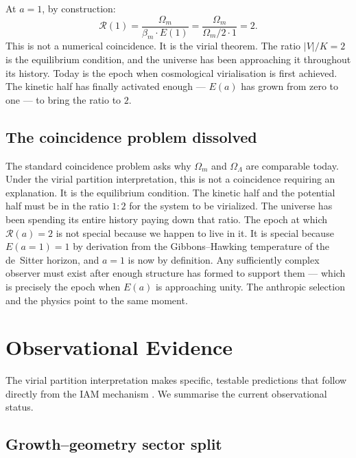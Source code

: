 \documentclass[12pt,a4paper]{article}
\begin{document}
At $a = 1$, by construction:
\begin{equation}
  \mathcal{R}(1) = \frac{\Omega_m}{\beta_m \cdot E(1)} = 
  \frac{\Omega_m}{\Omega_m/2 \cdot 1} = 2.
  \label{eq:virial_today}
\end{equation}
This is not a numerical coincidence. It is the virial theorem. The ratio $|V|/K = 2$
is the equilibrium condition, and the universe has been approaching it
throughout its history. Today is the epoch when cosmological virialisation is
first achieved. The kinetic half has finally activated enough --- $E(a)$ has
grown from zero to one --- to bring the ratio to $2$.

\subsection{The coincidence problem dissolved}

The standard coincidence problem asks why $\Omega_m$ and $\Omega_\Lambda$ are
comparable today. Under the virial partition interpretation, this is not a
coincidence requiring an explanation. It is the equilibrium condition. The
kinetic half and the potential half must be in the ratio $1:2$ for the
system to be virialized. The universe has been spending its entire history
paying down that ratio. The epoch at which $\mathcal{R}(a) = 2$ is not
special because we happen to live in it. It is special because $E(a = 1) = 1$
by derivation from the Gibbons--Hawking temperature of the de~Sitter horizon,
and $a = 1$ is now by definition. Any sufficiently complex observer must exist
after enough structure has formed to support them --- which is precisely the
epoch when $E(a)$ is approaching unity. The anthropic selection and the
physics point to the same moment.

\section{Observational Evidence}
\label{sec:evidence}

The virial partition interpretation makes specific, testable predictions that
follow directly from the IAM mechanism \citep{mahaffey2026,mahaffey2026_desi}.
We summarise the current observational status.

\subsection{Growth--geometry sector split}
\end{document}
